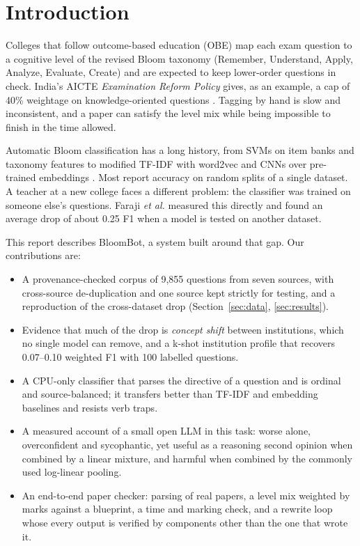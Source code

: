 \documentclass[conference]{IEEEtran}
\begin{document}
\section{Introduction}

Colleges that follow outcome-based education (OBE) map each exam question to a cognitive level
of the revised Bloom taxonomy (Remember, Understand, Apply, Analyze, Evaluate, Create)
\cite{bloom1956,anderson2001} and are expected to keep lower-order questions in check. India's
AICTE \emph{Examination Reform Policy} gives, as an example, a cap of 40\% weightage on
knowledge-oriented questions \cite{aicte2018}. Tagging by hand is slow and inconsistent, and a
paper can satisfy the level mix while being impossible to finish in the time allowed.

Automatic Bloom classification has a long history, from SVMs on item banks \cite{yahya2012}
and taxonomy features \cite{sangodiah2017} to modified TF-IDF with word2vec \cite{mohammed2020}
and CNNs over pre-trained embeddings \cite{gani2023}. Most report accuracy on random splits of a
single dataset. A teacher at a new college faces a different problem: the classifier was
trained on someone else's questions. Faraji \emph{et al.} \cite{faraji2026} measured this
directly and found an average drop of about 0.25 F1 when a model is tested on another dataset.

This report describes BloomBot, a system built around that gap. Our contributions are:
\begin{itemize}
\item A provenance-checked corpus of 9,855 questions from seven sources, with cross-source
  de-duplication and one source kept strictly for testing, and a reproduction of the
  cross-dataset drop (Section~\ref{sec:data}, \ref{sec:results}).
\item Evidence that much of the drop is \emph{concept shift} between institutions, which no single
  model can remove, and a k-shot institution profile that recovers 0.07--0.10 weighted F1 with
  100 labelled questions.
\item A CPU-only classifier that parses the directive of a question and is ordinal and
  source-balanced; it transfers better than TF-IDF and embedding baselines and resists verb traps.
\item A measured account of a small open LLM in this task: worse alone, overconfident and
  sycophantic, yet useful as a reasoning second opinion when combined by a linear mixture,
  and harmful when combined by the commonly used log-linear pooling.
\item An end-to-end paper checker: parsing of real papers, a level mix weighted by marks
  against a blueprint, a time and marking check, and a rewrite loop whose every output is
  verified by components other than the one that wrote it.
\end{itemize}
\end{document}
